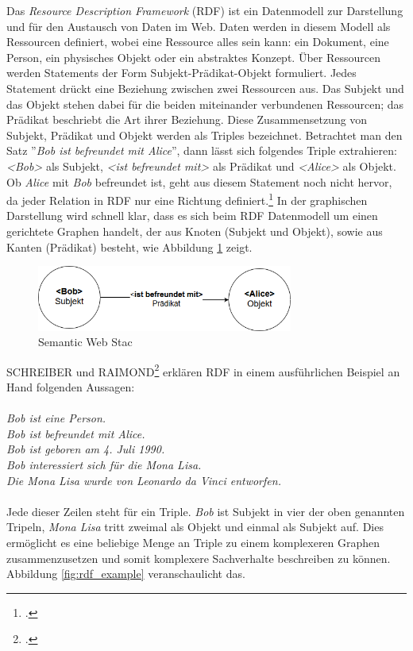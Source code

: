 \documentclass[12pt,a4paper]{article}
\begin{document}
Das \textit{Resource Description Framework} (RDF) ist ein Datenmodell zur Darstellung und für den Austausch von Daten im Web. Daten werden in diesem Modell als Ressourcen definiert, wobei eine Ressource alles sein kann: ein Dokument, eine Person, ein physisches Objekt oder ein abstraktes Konzept. Über Ressourcen werden Statements der Form Subjekt-Prädikat-Objekt formuliert. Jedes Statement drückt eine Beziehung zwischen zwei Ressourcen aus. Das Subjekt und das Objekt stehen dabei für die beiden miteinander verbundenen Ressourcen; das Prädikat beschriebt die Art ihrer Beziehung. Diese Zusammensetzung von Subjekt, Prädikat und Objekt werden als Triples bezeichnet. Betrachtet man den Satz ''\textit{Bob ist befreundet mit Alice}'', dann lässt sich folgendes Triple extrahieren: \textit{<Bob>} als Subjekt, \textit{<ist befreundet mit>} als Prädikat und \textit{<Alice>} als Objekt. Ob \textit{Alice} mit \textit{Bob} befreundet ist, geht aus diesem Statement noch nicht hervor, da jeder Relation in RDF nur eine Richtung definiert.\footcite[Vgl.][S.16-21]{powers2003practical} In der graphischen Darstellung wird schnell klar, dass es sich beim RDF Datenmodell um einen gerichtete Graphen handelt, der aus Knoten (Subjekt und Objekt), sowie aus Kanten (Prädikat) besteht, wie Abbildung \ref{fig:triple} zeigt.
\begin{figure}[h]
  \centering
	\includegraphics[width=0.75\textwidth]{img/triple.png}  
    \caption[ Semantic Web Stac]{ Semantic Web Stac}
  	\label{fig:triple}
\end{figure}
SCHREIBER und RAIMOND\footcite[Vgl.][]{schreiber2014rdf} erklären RDF in einem ausführlichen Beispiel an Hand folgenden Aussagen:
\\
\\
\textit{Bob ist eine Person.\\
Bob ist befreundet mit Alice.\\
Bob ist geboren am 4. Juli 1990. \\
Bob interessiert sich für die Mona Lisa.\\
Die Mona Lisa wurde von Leonardo da Vinci entworfen.}
\\
\\
Jede dieser Zeilen steht für ein Triple. \textit{Bob} ist Subjekt in vier der oben genannten Tripeln, \textit{Mona Lisa} tritt zweimal als Objekt und einmal als Subjekt auf. Dies ermöglicht es eine beliebige Menge an Triple zu einem komplexeren Graphen zusammenzusetzen und somit komplexere Sachverhalte beschreiben zu können. Abbildung \ref{fig:rdf_example} veranschaulicht das.
\end{document}
